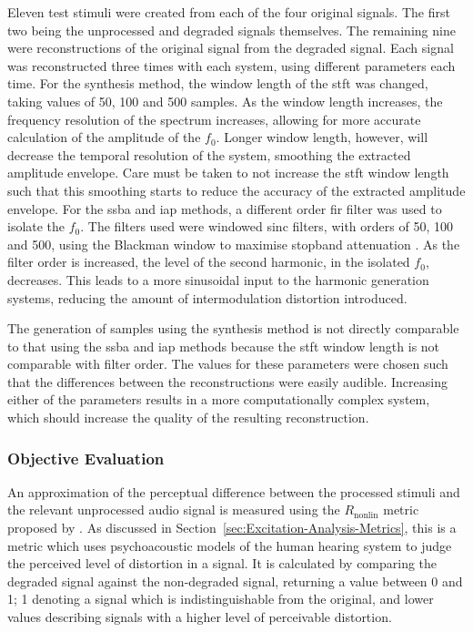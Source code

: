 			Eleven test stimuli were created from each of the four original signals. The first two being the
			unprocessed and degraded signals themselves. The remaining nine were reconstructions of the
			original signal from the degraded signal. Each signal was reconstructed three times with each
			system, using different parameters each time. For the synthesis method, the window length of the
			\acrshort{stft} was changed, taking values of 50, 100 and 500 samples. As the window length
			increases, the frequency resolution of the spectrum increases, allowing for more accurate
			calculation of the amplitude of the $f_{0}$.  Longer window length, however, will decrease the
			temporal resolution of the system, smoothing the extracted amplitude envelope. Care must be taken
			to not increase the \acrshort{stft} window length such that this smoothing starts to reduce the
			accuracy of the extracted amplitude envelope.  For the \acrshort{ssba} and \acrshort{iap} methods,
			a different order \acrshort{fir} filter was used to isolate the $f_{0}$. The filters used were
			windowed sinc filters, with orders of 50, 100 and 500, using the Blackman window to maximise
			stopband attenuation \citep{schlichtharle2011digital}. As the filter order is increased, the level
			of the second harmonic, in the isolated $f_{0}$, decreases.  This leads to a more sinusoidal input
			to the harmonic generation systems, reducing the amount of intermodulation distortion introduced.

			The generation of samples using the synthesis method is not directly comparable to that using the
			\acrshort{ssba} and \acrshort{iap} methods because the \acrshort{stft} window length is not
			comparable with filter order.  The values for these parameters were chosen such that the
			differences between the reconstructions were easily audible. Increasing either of the parameters
			results in a more computationally complex system, which should increase the quality of the
			resulting reconstruction.

		\subsubsection*{Objective Evaluation}
			An approximation of the perceptual difference between the processed stimuli and the relevant
			unprocessed audio signal is measured using the $R_{\mathrm{nonlin}}$ metric proposed by
			\citet{tan2004predicting}. As discussed in Section~\ref{sec:Excitation-Analysis-Metrics}, this is a
			metric which uses psychoacoustic models of the human hearing system to judge the perceived level of
			distortion in a signal. It is calculated by comparing the degraded signal against the non-degraded
			signal, returning a value between 0 and 1; 1 denoting a signal which is indistinguishable from the
			original, and lower values describing signals with a higher level of perceivable distortion.

